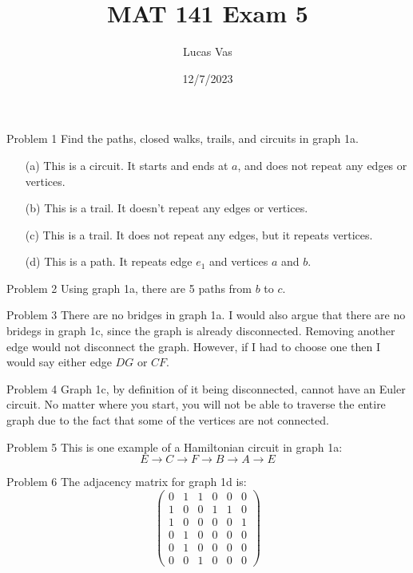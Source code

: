 \documentclass[12pt]{article}
\title{MAT 141 Exam 5}
\author{Lucas Vas}
\date{12/7/2023}
\begin{document}
\maketitle

  \begin{problem}{Problem 1}
    Find the paths, closed walks, trails, and circuits in graph 1a.
    \begin{itemize}
      \item[(a)] This is a circuit. It starts and ends at $a$, and does not repeat any edges or vertices.
      \item[(b)] This is a trail. It doesn't repeat any edges or vertices.
      \item[(c)] This is a trail. It does not repeat any edges, but it repeats vertices.
      \item[(d)] This is a path. It repeats edge $e_1$ and vertices $a$ and $b$.
    \end{itemize}
  \end{problem}

  \begin{problem}{Problem 2}
    Using graph 1a, there are 5 paths from $b$ to $c$.
  \end{problem}

  \begin{problem}{Problem 3}
    There are no bridges in graph 1a. I would also argue that there are no bridegs in graph 1c, since the graph
    is already disconnected. Removing another edge would not disconnect the graph. However, if I had to choose one
    then I would say either edge $DG$ or $CF$.
  \end{problem}

  \begin{problem}{Problem 4}
    Graph 1c, by definition of it being disconnected, cannot have an Euler circuit. No matter where you start,
    you will not be able to traverse the entire graph due to the fact that some of the vertices are not connected.
  \end{problem}

  \begin{problem}{Problem 5}
    This is one example of a Hamiltonian circuit in graph 1a:
    \[E \rightarrow C \rightarrow F \rightarrow B \rightarrow A \rightarrow E\]
  \end{problem}

  \begin{problem}{Problem 6}
    The adjacency matrix for graph 1d is:
    \[
      \begin{pmatrix}
        0 & 1 & 1 & 0 & 0 & 0 \\
        1 & 0 & 0 & 1 & 1 & 0 \\
        1 & 0 & 0 & 0 & 0 & 1 \\
        0 & 1 & 0 & 0 & 0 & 0 \\
        0 & 1 & 0 & 0 & 0 & 0 \\
        0 & 0 & 1 & 0 & 0 & 0 
      \end{pmatrix}
    \]
  \end{problem}
\end{document}
